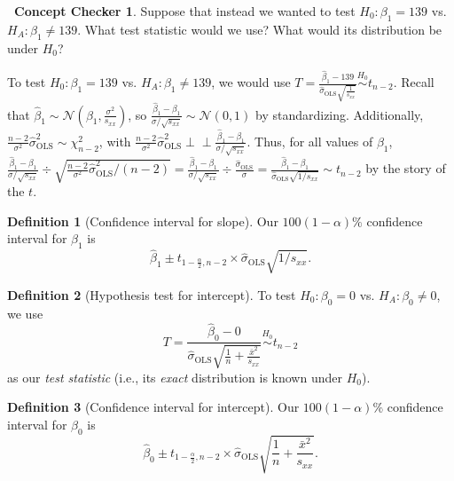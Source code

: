 \documentclass[12pt,oneside]{article}
\newcommand{\indep}{\perp\!\!\!\perp}
\newcommand{\OLS}{\text{OLS}}
\newcommand{\N}{\mathcal{N}}
\newcommand{\simnull}{\overset{H_0}{\sim}}
\theoremstyle{definition}
\newtheorem{definition}{Definition}
\newtheorem{concept}{\faPen \ Concept Checker}
\theoremstyle{remark}
\begin{document}
\begin{concept}
Suppose that instead we wanted to test $H_0: \beta_1 = 139$ vs. $H_A: \beta_1 \neq 139$. What test statistic would we use? What would its distribution be under $H_0$?
\end{concept}

\begin{solutionbox}
To test $H_0: \beta_1 = 139$ vs. $H_A: \beta_1 \neq 139$, we would use $T = \frac{\hat{\beta}_{1} - 139}{\hat{\sigma}_{\OLS} \sqrt{\frac{1}{s_{xx}}}} \simnull t_{n - 2}$. Recall that $\hat{\beta}_{1} \sim \N \left( \beta_1, \frac{\sigma^2}{s_{xx}} \right)$, so $\frac{\hat{\beta}_{1} - \beta_1}{\sigma / \sqrt{s_{xx}}} \sim \N(0, 1)$ by standardizing. Additionally, $\frac{n - 2}{\sigma^2} \hat{\sigma}^2_{\OLS} \sim \chi^2_{n - 2}$, with $\frac{n - 2}{\sigma^2} \hat{\sigma}^2_{\OLS} \indep \frac{\hat{\beta}_{1} - \beta_1}{\sigma / \sqrt{s_{xx}}}$. Thus, for all values of $\beta_1$, $\frac{\hat{\beta}_{1} - \beta_1}{\sigma / \sqrt{s_{xx}}} \div \sqrt{\frac{n - 2}{\sigma^2} \hat{\sigma}^2_{\OLS} / (n - 2)} = \frac{\hat{\beta}_{1} - \beta_1}{\sigma / \sqrt{s_{xx}}} \div \frac{\hat{\sigma}_{\OLS}}{\sigma} = \frac{\hat{\beta}_{1} - \beta_1}{\hat{\sigma}_{\OLS} \sqrt{1 / s_{xx}}} \sim t_{n - 2}$ by the story of the $t$.
\end{solutionbox}


\begin{definition}[Confidence interval for slope]
Our $100 (1 - \alpha) \%$ confidence interval for $\beta_1$ is \[\hat{\beta}_{1} \pm t_{1 - \frac{\alpha}{2}, n - 2} \times \hat{\sigma}_{\OLS} \sqrt{1 / s_{xx}}.\]
\end{definition}

\begin{definition}[Hypothesis test for intercept]
To test $H_0: \beta_0 = 0$ vs. $H_A: \beta_0 \neq 0$, we use \[T = \frac{\hat{\beta}_{0} - 0}{\hat{\sigma}_{\OLS} \sqrt{\frac{1}{n} + \frac{\bar{x}^2}{s_{xx}}}} \simnull t_{n - 2}\] as our \textit{test statistic} (i.e., its \textit{exact} distribution is known under $H_0$).
\end{definition}

\begin{definition}[Confidence interval for intercept]
Our $100 (1 - \alpha) \%$ confidence interval for $\beta_0$ is \[\hat{\beta}_{0} \pm t_{1 - \frac{\alpha}{2}, n - 2} \times \hat{\sigma}_{\OLS} \sqrt{\frac{1}{n} + \frac{\bar{x}^2}{s_{xx}}}.\]
\end{definition}
\end{document}
